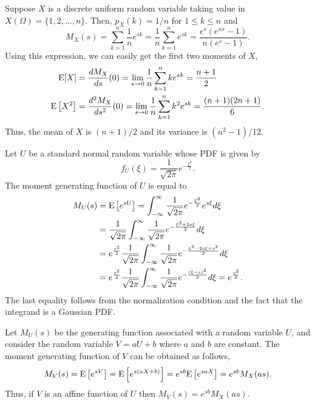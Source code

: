 \begin{example}
Suppose $X$ is a discrete uniform random variable taking value in $X(\Omega) = \{ 1, 2, \ldots, n \}$.
Then, $p_X(k) = 1/n$ for $1 \leq k \leq n$ and
\begin{equation*}
M_X(s) = \sum_{k = 1}^n \frac{1}{n} e^{sk}
= \frac{1}{n} \sum_{k = 1}^n e^{sk}
= \frac {e^s (e^{ns} - 1)} {n (e^s - 1)} .
\end{equation*}
Using this expression, we can easily get the first two moments of $X$,
\begin{align*}
\mathrm{E} [X] &= \frac{d M_X}{ds} (0)
= \lim_{s \rightarrow 0} \frac{1}{n} \sum_{k = 1}^n k e^{sk} = \frac{n + 1}{2} \\
\mathrm{E} \left[ X^2 \right] &= \frac{d^2 M_X}{ds^2} (0)
= \lim_{s \rightarrow 0} \frac{1}{n} \sum_{k=1}^n k^2 e^{sk}
= \frac {(n + 1)(2n + 1)}{6} .
\end{align*}
Thus, the mean of $X$ is $(n+1)/2$ and its variance is $(n^2 - 1)/12$.
\end{example}

\begin{example}
Let $U$ be a standard normal random variable whose PDF is given by
\begin{equation*}
f_U (\xi) = \frac{1}{\sqrt{2 \pi}} e^{- \frac{\xi^2}{2}}.
\end{equation*}
The moment generating function of $U$ is equal to
\begin{equation*}
\begin{split}
M_U (s) &= \mathrm{E} \left[ e^{sU} \right]
= \int_{- \infty}^{\infty} \frac{1}{\sqrt{2 \pi}} e^{- \frac{\xi^2}{2}} e^{s\xi} d\xi \\
&= \frac{1}{\sqrt{2 \pi}} \int_{- \infty}^{\infty}
\frac{1}{\sqrt{2 \pi}} e^{- \frac{\xi^2 + 2 s \xi}{2}} d\xi \\
&= e^{\frac{s^2}{2}} \frac{1}{\sqrt{2 \pi}} \int_{- \infty}^{\infty}
\frac{1}{\sqrt{2 \pi}} e^{- \frac{\xi^2 - 2 s \xi + s^2}{2}} d\xi \\
&= e^{\frac{s^2}{2}} \frac{1}{\sqrt{2 \pi}}
\int_{- \infty}^{\infty} \frac{1}{\sqrt{2 \pi}} e^{- \frac{(\xi - s)^2}{2}} d\xi
= e^{\frac{s^2}{2}} .
\end{split}
\end{equation*}
The last equality follows from the normalization condition and the fact that the integrand is a Gaussian PDF.
\end{example}

Let $M_U(s)$ be the generating function associated with a random variable $U$, and consider the random variable $V = aU + b$ where $a$ and $b$ are constant.
The moment generating function of $V$ can be obtained as follows,
\begin{equation*}
M_V (s) = \mathrm{E} \left[ e^{s V} \right]
= \mathrm{E} \left[ e^{s (aX + b)} \right]
= e^{sb} \mathrm{E} \left[ e^{saX} \right]
= e^{sb} M_X (as) .
\end{equation*}
Thus, if $V$ is an affine function of $U$ then $M_V (s) = e^{sb} M_X (as)$.


